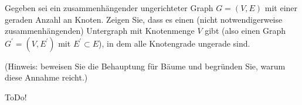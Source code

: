
\begin{exercise}

Gegeben sei ein zusammenhängender ungerichteter Graph $G = (V,E)$ mit einer geraden Anzahl an Knoten.
Zeigen Sie, dass es einen (nicht notwendigerweise zusammenhängenden) Untergraph mit
Knotenmenge $V$ gibt (also einen Graph $G^\prime = (V, E^\prime)$ mit $E^\prime \subset E$),
in dem alle Knotengrade ungerade sind.

(Hinweis: beweisen Sie die Behauptung für Bäume und begründen Sie, warum diese Annahme reicht.)

\end{exercise}


\begin{solution}

ToDo!

\end{solution}

